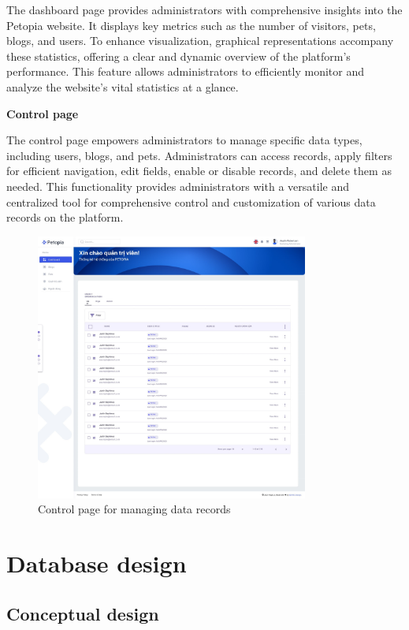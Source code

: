 The dashboard page provides administrators with comprehensive insights into the Petopia website. It displays key metrics such as the number of visitors, pets, blogs, and users. To enhance visualization, graphical representations accompany these statistics, offering a clear and dynamic overview of the platform's performance. This feature allows administrators to efficiently monitor and analyze the website's vital statistics at a glance.

\textbf{Control page}

The control page empowers administrators to manage specific data types, including users, blogs, and pets. Administrators can access records, apply filters for efficient navigation, edit fields, enable or disable records, and delete them as needed. This functionality provides administrators with a versatile and centralized tool for comprehensive control and customization of various data records on the platform.

\begin {figure}[H]
\centering
\includegraphics[width=0.8\textwidth]{Figures/control_bo_ui.jpg}
\caption{Control page for managing data records}
\end{figure}

\section{Database design}

\subsection{Conceptual design}

